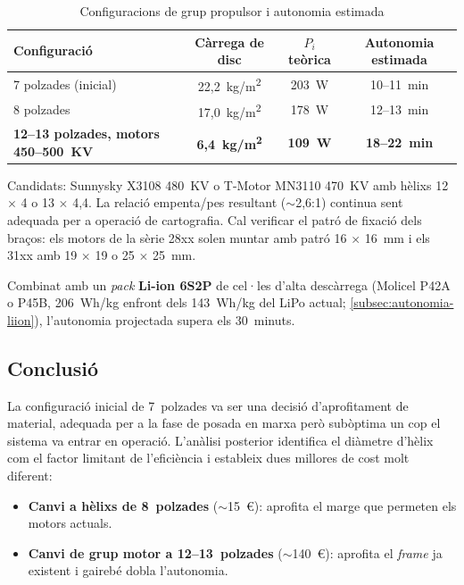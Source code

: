 \begin{table}[H]
    \centering
    \caption{Configuracions de grup propulsor i autonomia estimada}
    \label{tab:continuitat-propulsor}
    \small
    \begin{tabular}{lccc}
        \toprule
        Configuració & Càrrega de disc & $P_i$ teòrica & Autonomia estimada \\
        \midrule
        7 polzades (inicial) & 22,2~kg/m\textsuperscript{2} & 203~W & 10--11~min \\
        8 polzades & 17,0~kg/m\textsuperscript{2} & 178~W & 12--13~min \\
        \textbf{12--13 polzades, motors 450--500~KV} & \textbf{6,4~kg/m\textsuperscript{2}} & \textbf{109~W} & \textbf{18--22~min} \\
        \bottomrule
    \end{tabular}
\end{table}

Candidats: Sunnysky X3108 480~KV o T-Motor MN3110 470~KV amb hèlixs 12 $\times$ 4 o 13 $\times$ 4,4. La relació empenta/pes resultant ($\sim$2,6:1) continua sent adequada per a operació de cartografia. Cal verificar el patró de fixació dels braços: els motors de la sèrie 28xx solen muntar amb patró 16 $\times$ 16~mm i els 31xx amb 19 $\times$ 19 o 25 $\times$ 25~mm.

Combinat amb un \emph{pack} \textbf{Li-ion 6S2P} de cel·les d'alta descàrrega (Molicel P42A o P45B, 206~Wh/kg enfront dels 143~Wh/kg del LiPo actual; \cref{subsec:autonomia-liion}), l'autonomia projectada supera els 30~minuts.

\subsection{Conclusió}

La configuració inicial de 7~polzades va ser una decisió d'aprofitament de material, adequada per a la fase de posada en marxa però subòptima un cop el sistema va entrar en operació. L'anàlisi posterior identifica el diàmetre d'hèlix com el factor limitant de l'eficiència i estableix dues millores de cost molt diferent:

\begin{itemize}
    \item \textbf{Canvi a hèlixs de 8~polzades} ($\sim$15~€): aprofita el marge que permeten els motors actuals.
    \item \textbf{Canvi de grup motor a 12--13~polzades} ($\sim$140~€): aprofita el \emph{frame} ja existent i gairebé dobla l'autonomia.
\end{itemize}

